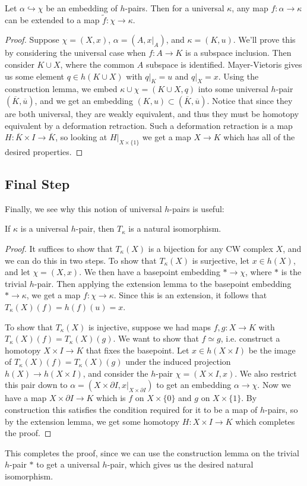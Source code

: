 \documentclass[11pt,letterpaper]{article}
\begin{document}
\begin{lemma}[Extension]
    Let $\alpha \hookrightarrow \chi$ be an embedding of $h$-pairs. Then for a universal $\kappa$, any map $f : \alpha \to \kappa$ can be extended to a map $\widetilde{f} : \chi \to \kappa$. 
\end{lemma}

\begin{proof}
    Suppose $\chi = (X, x)$, $\alpha = (A, x|_A)$, and $\kappa=(K,u)$. We'll prove this by considering the universal case when $f : A \to K$ is a subspace inclusion. Then consider $K\cup X$, where the common $A$ subspace is identified. Mayer-Vietoris gives us some element $q\in h(K\cup X)$ with $q|_K = u$ and $q|_X = x$. Using the construction lemma, we embed $\kappa\cup \chi = (K\cup X, q)$ into some universal $h$-pair $(\overline{K}, \overline{u})$, and we get an embedding $(K, u)\subset (\overline{K},\overline{u})$. Notice that since they are both universal, they are weakly equivalent, and thus they must be homotopy equivalent by a deformation retraction. Such a deformation retraction is a map $H:\overline{K}\times I \to \overline{K}$, so looking at $H|_{X\times \{1\}}$ we get a map $X \to K$ which has all of the desired properties.
\end{proof}

\subsection{Final Step}

Finally, we see why this notion of universal $h$-pairs is useful:

\begin{lemma}
    If $\kappa$ is a universal $h$-pair, then $T_\kappa$ is a natural isomorphism.
\end{lemma}

\begin{proof}
    It suffices to show that $T_\kappa(X)$ is a bijection for any CW complex $X$, and we can do this in two steps. To show that $T_\kappa(X)$ is surjective, let $x\in h(X)$, and let $\chi = (X,x)$. We then have a basepoint embedding $* \to \chi$, where $*$ is the trivial $h$-pair. Then applying the extension lemma to the basepoint embedding $* \to \kappa$, we get a map $f : \chi \to \kappa$. Since this is an extension, it follows that $T_\kappa(X)(f)=h(f)(u)=x$.

    To show that $T_\kappa(X)$ is injective, suppose we had maps $f,g : X \to K$ with $T_\kappa(X)(f)=T_\kappa(X)(g)$. We want to show that $f\simeq g$, i.e. construct a homotopy $X\times I \to K$ that fixes the basepoint. Let $x\in h(X\times I)$ be the image of $T_\kappa(X)(f)=T_\kappa(X)(g)$ under the induced projection $h(X) \to h(X\times I)$, and consider the $h$-pair $\chi=(X\times I, x)$. We also restrict this pair down to $\alpha = (X\times \partial I, x|_{X\times \partial I})$ to get an embedding $\alpha \to \chi$. Now we have a map $X\times \partial I \to K$ which is $f$ on $X\times \{0\}$ and $g$ on $X\times \{1\}$. By construction this satisfies the condition required for it to be a map of $h$-pairs, so by the extension lemma, we get some homotopy $H : X\times I \to K$ which completes the proof.
\end{proof}

This completes the proof, since we can use the construction lemma on the trivial $h$-pair $*$ to get a universal $h$-pair, which gives us the desired natural isomorphism.
\end{document}
